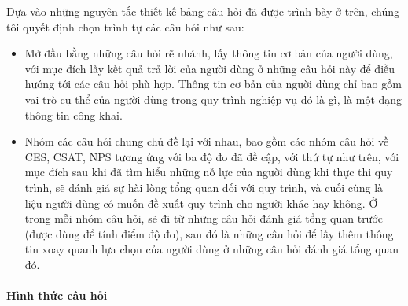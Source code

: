 \par
Dựa vào những nguyên tắc thiết kế bảng câu hỏi đã được trình bày ở trên, chúng tôi quyết định chọn trình tự các câu hỏi như sau:
\begin{itemize}
    \item Mở đầu bằng những câu hỏi rẽ nhánh, lấy thông tin cơ bản của người dùng, với mục đích lấy kết quả trả lời của người dùng ở những câu hỏi này để điều hướng tới các câu hỏi phù hợp. Thông tin cơ bản của người dùng chỉ bao gồm vai trò cụ thể của người dùng trong quy trình nghiệp vụ đó là gì, là một dạng thông tin công khai.
    \item Nhóm các câu hỏi chung chủ đề lại với nhau, bao gồm các nhóm câu hỏi về CES, CSAT, NPS tương ứng với ba độ đo đã đề cập, với thứ tự như trên, với mục đích sau khi đã tìm hiểu những nỗ lực của người dùng khi thực thi quy trình, sẽ đánh giá sự hài lòng tổng quan đối với quy trình, và cuối cùng là liệu người dùng có muốn đề xuất quy trình cho người khác hay không. Ở trong mỗi nhóm câu hỏi, sẽ đi từ những câu hỏi đánh giá tổng quan trước (được dùng để tính điểm độ đo), sau đó là những câu hỏi để lấy thêm thông tin xoay quanh lựa chọn của người dùng ở những câu hỏi đánh giá tổng quan đó.
\end{itemize}
\paragraph{Hình thức câu hỏi}\mbox{}

